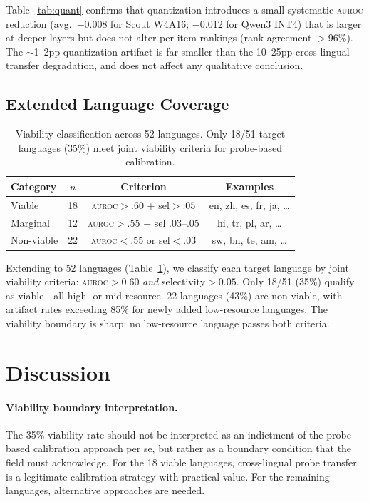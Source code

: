\documentclass[11pt,a4paper]{article}
\newcommand{\auroc}{\textsc{auroc}}
\begin{document}
Table~\ref{tab:quant} confirms that quantization introduces a small systematic \auroc{} reduction (avg.\ $-$0.008 for Scout W4A16; $-$0.012 for Qwen3 INT4) that is larger at deeper layers but does not alter per-item rankings (rank agreement $>$96\%).
The $\sim$1--2pp quantization artifact is far smaller than the 10--25pp cross-lingual transfer degradation, and does not affect any qualitative conclusion.

\subsection{Extended Language Coverage}
\label{sec:extended}

\begin{table}[t]
\centering
\small
\begin{tabular}{lccc}
\toprule
\textbf{Category} & $n$ & \textbf{Criterion} & \textbf{Examples} \\
\midrule
Viable & 18 & \auroc{}${>}.60$ + sel${>}.05$ & en, zh, es, fr, ja, \ldots \\
Marginal & 12 & \auroc{}${>}.55$ + sel .03--.05 & hi, tr, pl, ar, \ldots \\
Non-viable & 22 & \auroc{}${<}.55$ or sel${<}.03$ & sw, bn, te, am, \ldots \\
\bottomrule
\end{tabular}
\caption{Viability classification across 52 languages. Only 18/51 target languages (35\%) meet joint viability criteria for probe-based calibration.}
\label{tab:viability}
\end{table}

Extending to 52 languages (Table~\ref{tab:viability}), we classify each target language by joint viability criteria: \auroc{}${>}0.60$ \emph{and} selectivity${>}0.05$.
Only 18/51 (35\%) qualify as viable---all high- or mid-resource.
22 languages (43\%) are non-viable, with artifact rates exceeding 85\% for newly added low-resource languages.
The viability boundary is sharp: no low-resource language passes both criteria.

\section{Discussion}
\label{sec:discussion}

\paragraph{Viability boundary interpretation.}
The 35\% viability rate should not be interpreted as an indictment of the probe-based calibration approach per se, but rather as a boundary condition that the field must acknowledge.
For the 18 viable languages, cross-lingual probe transfer is a legitimate calibration strategy with practical value.
For the remaining languages, alternative approaches are needed.
\end{document}

